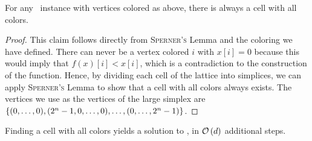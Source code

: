 \begin{claim}
    For any \Tarskistar\ instance with vertices colored as above, there is always a cell with all colors.
\end{claim}
\begin{proof}
    This claim follows directly from \textsc{Sperner's} Lemma and the coloring we have defined. There can never be a vertex colored $i$ with $x[i] = 0$ because this would imply that $f(x)[i] < x[i]$, which is a contradiction to the construction of the function. Hence, by dividing each cell of the lattice into simplices, we can apply \textsc{Sperner's} Lemma to show that a cell with all colors always exists. The vertices we use as the vertices of the large simplex are $\left\{(0, \dots, 0), (2^n - 1, 0, \dots, 0), \dots, (0, \dots, 2^n - 1)\right\}$.
\end{proof}
\begin{claim}
    Finding a cell with all colors yields a solution to \Tarskistar, in $\mathcal{O}\left(d\right)$ additional steps.
\end{claim}
